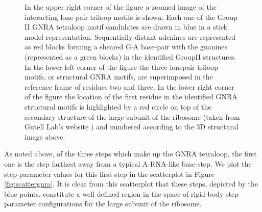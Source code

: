 \begin{figure}
{  In  the upper  right corner  of  the figure  a zoomed  image of  the
  interacting lone-pair triloop motifs is shown. Each one of the Group
  II  GNRA tetraloop motif  candidates are  drawn in  blue in  a stick
  model representation. Sequentially  distant adenines are represented
  as  red  blocks  forming  a  sheared G$\cdot$A  base-pair  with  the
  guanines (represented  as a green blocks) in  the identified GroupII
  structures.
  In the  lower left corner of  the figure the  three lonepair triloop
  motifs, or structural GNRA motifs, are superimposed in the reference
  frame of residues  two and three.  In the lower  right corner of the
  figure  the location  of the  first residue  in the  identified GNRA
  structural  motifs is  highlighted by  a red  circle on  top  of the
  secondary structure of the large subunit of the ribosome (taken from
  Gutell Lab's  website \cite{cannone2002}) and  numbered according to
  the 3D structural image above.}
\label{fig:terts}
\end{figure}

As noted above,  of the three steps which make  up the GNRA tetraloop,
the  first one is  the step  farthest away  from a  typical A-RNA-like
base-step.  We plot  the step-parameter values for this  first step in
the  scatterplot in  Figure \ref{fig:scattergnra}.   It is  clear from
this  scatterplot  that these  steps,  depicted  by  the blue  points,
constitute  a well  defined region  in  the space  of rigid-body  step
parameter configurations for the large subunit of the ribosome.

